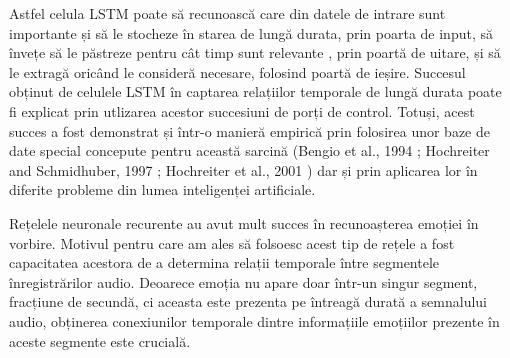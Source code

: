 \documentclass[a4paper,12pt]{book}
\begin{document}
				Astfel celula LSTM poate să recunoască care din datele de intrare sunt importante și să le stocheze în starea de lungă durata, prin poarta de input, să învețe să le păstreze pentru cât timp sunt relevante , prin poartă de uitare, și să le extragă oricând le consideră necesare, folosind poartă de ieșire. Succesul obținut de celulele LSTM în captarea relațiilor temporale de lungă durata poate fi explicat prin utlizarea acestor succesiuni de porți de control. Totuși, acest succes a fost demonstrat și într-o manieră empirică prin folosirea unor baze de date special concepute pentru această sarcină (Bengio et al., 1994 \cite{rnn3}; Hochreiter and Schmidhuber, 1997 \cite{rnn4}; Hochreiter et al., 2001 \cite{rnn5}) dar și prin aplicarea lor în diferite probleme din lumea inteligenței artificiale. \par
				
				Rețelele neuronale recurente au avut mult succes în recunoașterea emoției în vorbire. Motivul pentru care am ales să folsoesc acest tip de rețele a fost capacitatea acestora de a determina relații temporale între segmentele înregistrărilor audio. Deoarece emoția nu apare doar într-un singur segment, fracțiune de secundă, ci aceasta este prezenta pe întreagă durată a semnalului audio, obținerea  conexiunilor temporale dintre informațiile emoțiilor prezente în aceste segmente este crucială. 
				
\end{document}
